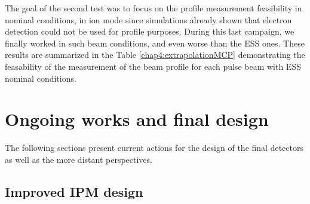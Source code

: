 The goal of the second test was to focus on the profile measurement feasibility in nominal conditions, in ion mode since simulations already shown that electron detection could not be used for profile purposes. During this last campaign, we finally worked in such beam conditions, and even worse than the ESS ones. These results are summarized in the Table \ref{chap4:extrapolationMCP} demonstrating the feasability of the measurement of the beam profile for each pulse beam with ESS nominal conditions.




\section*{Ongoing works and final design}

The following sections present current actions for the design of the final detectors as well as the more distant perspectives.
%
\subsection*{Improved IPM design}

